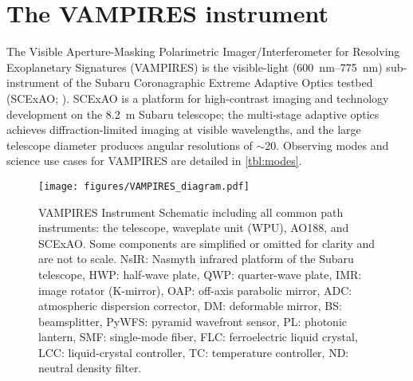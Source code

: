 \section{The VAMPIRES instrument}\label{sec:design}

The Visible Aperture-Masking Polarimetric Imager/Interferometer for Resolving Exoplanetary Signatures (VAMPIRES) is the visible-light (\SIrange{600}{775}{\nano\meter}) sub-instrument of the Subaru Coronagraphic Extreme Adaptive Optics testbed (SCExAO; \citealp{jovanovic_subaru_2015}). SCExAO is a platform for high-contrast imaging and technology development on the \SI{8.2}{\meter} Subaru telescope; the multi-stage adaptive optics achieves diffraction-limited imaging at visible wavelengths, and the large telescope diameter produces angular resolutions of $\sim$\SI{20}{\mas}. Observing modes and science use cases for VAMPIRES are detailed in \autoref{tbl:modes}.

\begin{figure*}
    \centering
    \texttt{[image: figures/VAMPIRES\_diagram.pdf]}
    \caption{VAMPIRES Instrument Schematic including all common path instruments: the telescope, waveplate unit (WPU), AO188, and SCExAO. Some components are simplified or omitted for clarity and are not to scale. NsIR: Nasmyth infrared platform of the Subaru telescope, HWP: half-wave plate, QWP: quarter-wave plate, IMR: image rotator (K-mirror), OAP: off-axis parabolic mirror, ADC: atmospheric dispersion corrector, DM: deformable mirror, BS: beamsplitter, PyWFS: pyramid wavefront sensor, PL: photonic lantern, SMF: single-mode fiber, FLC: ferroelectric liquid crystal, LCC: liquid-crystal controller, TC: temperature controller, ND: neutral density filter.\label{fig:schematic}}
\end{figure*}


